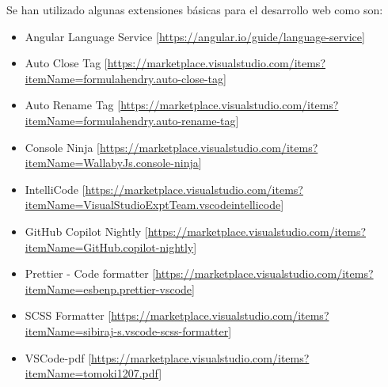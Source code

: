 Se han utilizado algunas extensiones básicas para el desarrollo web como son:
\begin{itemize}
      \item Angular Language Service [\url{https://angular.io/guide/language-service}]
      \item Auto Close Tag
                  [\url{https://marketplace.visualstudio.com/items?itemName=formulahendry.auto-close-tag}]
      \item Auto Rename Tag
                  [\url{https://marketplace.visualstudio.com/items?itemName=formulahendry.auto-rename-tag}]
      \item Console Ninja
                  [\url{https://marketplace.visualstudio.com/items?itemName=WallabyJs.console-ninja}]
      \item IntelliCode
            [\url{https://marketplace.visualstudio.com/items?itemName=VisualStudioExptTeam.vscodeintellicode}]
      \item GitHub Copilot Nightly
                  [\url{https://marketplace.visualstudio.com/items?itemName=GitHub.copilot-nightly}]
      \item Prettier - Code formatter
                  [\url{https://marketplace.visualstudio.com/items?itemName=esbenp.prettier-vscode}]
      \item SCSS Formatter
                  [\url{https://marketplace.visualstudio.com/items?itemName=sibiraj-s.vscode-scss-formatter}]
      \item VSCode-pdf
            [\url{https://marketplace.visualstudio.com/items?itemName=tomoki1207.pdf}]
\end{itemize}